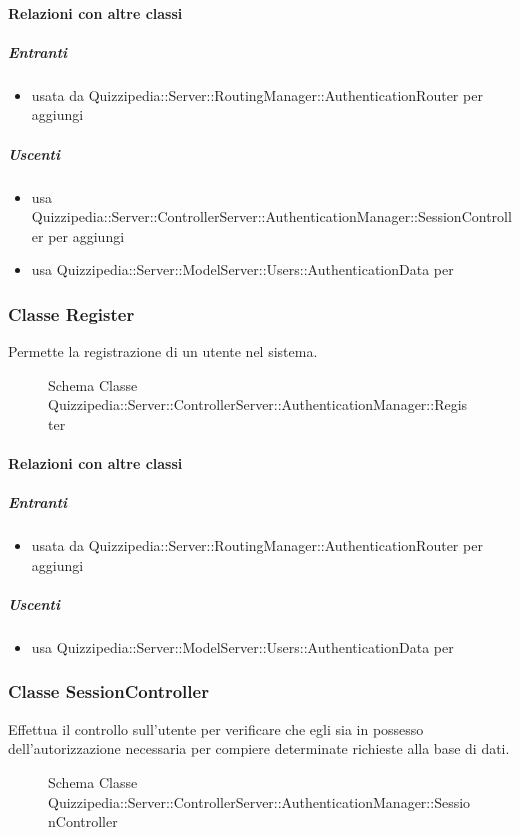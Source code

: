 \paragraph{Relazioni con altre classi}
\subparagraph{Entranti}
\begin{itemize}
\item usata da Quizzipedia::Server::RoutingManager::AuthenticationRouter per aggiungi
\end{itemize}
\subparagraph{Uscenti}
\begin{itemize}
\item usa Quizzipedia::Server::ControllerServer::AuthenticationManager::SessionController per aggiungi
\item usa Quizzipedia::Server::ModelServer::Users::AuthenticationData per 
\end{itemize}
\subsubsection{Classe Register}
Permette la registrazione di un utente nel sistema.
\begin{figure}[H]
\centering
\noindent{}
\caption[Schema Classe Register]{Schema Classe Quizzipedia::Server::ControllerServer::AuthenticationManager::Register}
\end{figure}
\paragraph{Relazioni con altre classi}
\subparagraph{Entranti}
\begin{itemize}
\item usata da Quizzipedia::Server::RoutingManager::AuthenticationRouter per aggiungi
\end{itemize}
\subparagraph{Uscenti}
\begin{itemize}
\item usa Quizzipedia::Server::ModelServer::Users::AuthenticationData per 
\end{itemize}
\subsubsection{Classe SessionController}
Effettua il controllo sull'utente per verificare che egli sia in possesso dell'autorizzazione necessaria per compiere determinate richieste alla base di dati.
\begin{figure}[H]
\centering
\noindent{}
\caption[Schema Classe SessionController]{Schema Classe Quizzipedia::Server::ControllerServer::AuthenticationManager::SessionController}
\end{figure}
